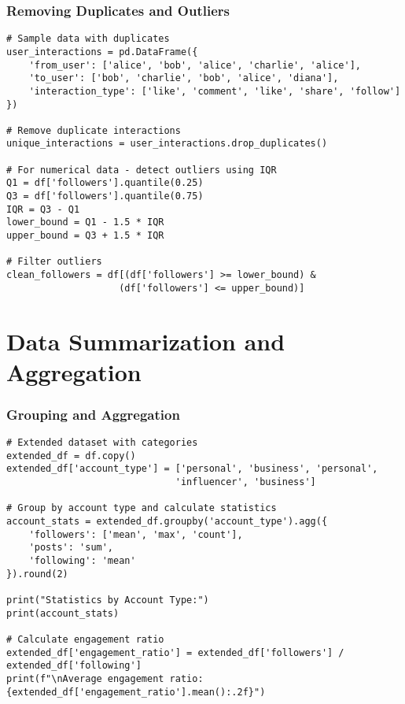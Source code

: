 \documentclass[aspectratio=169]{beamer}
\begin{document}
\begin{frame}[fragile]
\frametitle{Removing Duplicates and Outliers}
\begin{lstlisting}[caption=Data Quality Checks]
# Sample data with duplicates
user_interactions = pd.DataFrame({
    'from_user': ['alice', 'bob', 'alice', 'charlie', 'alice'],
    'to_user': ['bob', 'charlie', 'bob', 'alice', 'diana'],
    'interaction_type': ['like', 'comment', 'like', 'share', 'follow']
})

# Remove duplicate interactions
unique_interactions = user_interactions.drop_duplicates()

# For numerical data - detect outliers using IQR
Q1 = df['followers'].quantile(0.25)
Q3 = df['followers'].quantile(0.75)
IQR = Q3 - Q1
lower_bound = Q1 - 1.5 * IQR
upper_bound = Q3 + 1.5 * IQR

# Filter outliers
clean_followers = df[(df['followers'] >= lower_bound) & 
                    (df['followers'] <= upper_bound)]
\end{lstlisting}
\end{frame}

\section{Data Summarization and Aggregation}

\begin{frame}[fragile]
\frametitle{Grouping and Aggregation}
\begin{lstlisting}[caption=Summarizing Data by Groups]
# Extended dataset with categories
extended_df = df.copy()
extended_df['account_type'] = ['personal', 'business', 'personal', 
                              'influencer', 'business']

# Group by account type and calculate statistics
account_stats = extended_df.groupby('account_type').agg({
    'followers': ['mean', 'max', 'count'],
    'posts': 'sum',
    'following': 'mean'
}).round(2)

print("Statistics by Account Type:")
print(account_stats)

# Calculate engagement ratio
extended_df['engagement_ratio'] = extended_df['followers'] / extended_df['following']
print(f"\nAverage engagement ratio: {extended_df['engagement_ratio'].mean():.2f}")
\end{lstlisting}
\end{frame}
\end{document}
